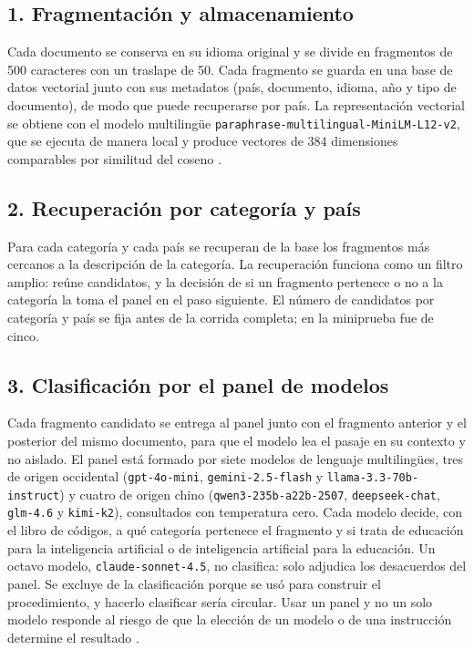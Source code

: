 \subsection*{1. Fragmentación y almacenamiento}

Cada documento se conserva en su idioma original y se divide en fragmentos de 500
caracteres con un traslape de 50. Cada fragmento se guarda en una base de datos vectorial
junto con sus metadatos (país, documento, idioma, año y tipo de documento), de modo que
puede recuperarse por país. La representación vectorial se obtiene con el modelo
multilingüe \texttt{paraphrase-multilingual-MiniLM-L12-v2}, que se ejecuta de manera local
y produce vectores de 384 dimensiones comparables por similitud del coseno
\citep{reimers2019sentencebert}.

\subsection*{2. Recuperación por categoría y país}

Para cada categoría y cada país se recuperan de la base los fragmentos más cercanos a la
descripción de la categoría. La recuperación funciona como un filtro amplio: reúne
candidatos, y la decisión de si un fragmento pertenece o no a la categoría la toma el panel
en el paso siguiente. El número de candidatos por categoría y país se fija antes de la corrida completa; en la miniprueba fue de cinco.

\subsection*{3. Clasificación por el panel de modelos}

Cada fragmento candidato se entrega al panel junto con el fragmento anterior y el
posterior del mismo documento, para que el modelo lea el pasaje en su contexto y no aislado.
El panel está formado por siete modelos de lenguaje multilingües, tres de origen occidental
(\texttt{gpt-4o-mini}, \texttt{gemini-2.5-flash} y \texttt{llama-3.3-70b-instruct}) y cuatro
de origen chino (\texttt{qwen3-235b-a22b-2507}, \texttt{deepseek-chat}, \texttt{glm-4.6} y
\texttt{kimi-k2}), consultados con temperatura cero. Cada modelo decide, con el libro de
códigos, a qué categoría pertenece el fragmento y si trata de educación para la inteligencia
artificial o de inteligencia artificial para la educación. Un octavo modelo,
\texttt{claude-sonnet-4.5}, no clasifica: solo adjudica los desacuerdos del panel. Se
excluye de la clasificación porque se usó para construir el procedimiento, y hacerlo
clasificar sería circular. Usar un panel y no un solo modelo responde al riesgo de que la
elección de un modelo o de una instrucción determine el resultado
\citep{baumann2025llmhacking}.

